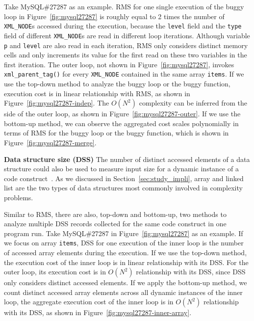 Take MySQL\#27287 as an example.
RMS for one single execution of
the buggy loop in Figure~\ref{fig:mysql27287}
is roughly equal to 2 times the number of \texttt{XML\_NODE}s 
accessed during the execution, 
because the \texttt{level} field and the \texttt{type} field of 
different \texttt{XML\_NODE}s are read in different loop iterations.
Although variable \texttt{p} and \texttt{level} are also read in each iteration,
RMS only considers distinct memory cells and 
only increments its value for the first read on these two variables in the first iteration. 
The outer loop, not shown in Figure~\ref{fig:mysql27287}, 
invokes \texttt{xml\_parent\_tag()} for every \texttt{XML\_NODE} contained
in the same array \texttt{items}.
If we use the top-down method to analyze the buggy loop
or the buggy function, 
execution cost is in linear relationship with RMS, 
as shown in Figure~\ref{fig:mysql27287-indep}.
The $O(N^2)$ complexity can be inferred from the side of the outer loop, 
as shown in Figure~\ref{fig:mysql27287-outer}. 
If we use the bottom-up method, 
we can observe the aggregated cost scales 
polynomially in terms of RMS for the buggy loop 
or the buggy function, 
which is shown in Figure~\ref{fig:mysql27287-merge}. 

\noindent\textbf{Data structure size (DSS)}
The number of distinct accessed elements of a data 
structure could also be used to measure 
input size for a dynamic instance of a code construct~\cite{AlgoProf}. 
As we discussed in Section~\ref{sec:study_impli},
array and linked list are the two types of data structures
most commonly involved in complexity problems. 

Similar to RMS, there are also, top-down and bottom-up, 
two methods to analyze 
multiple DSS records collected for the same code 
construct in one program run.
Take MySQL\#27287 in Figure~\ref{fig:mysql27287} as an example.
If we focus on array \texttt{items},
DSS for one execution of the inner loop is the number of 
accessed array elements during the execution.
If we use the top-down method, the execution cost 
of the inner loop is in linear relationship with its DSS.
For the outer loop, its execution cost is in $O(N^2)$ relationship with its DSS,
since DSS only considers distinct accessed elements.
If we apply the bottom-up method, 
we count distinct accessed array elements across all dynamic instances of the inner loop,
the aggregate execution cost of the inner loop is in $O(N^2)$ relationship with its DSS, 
as shown in Figure~\ref{fig:mysql27287-inner-array}.   

